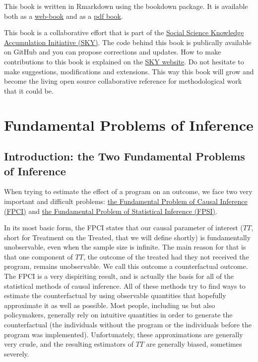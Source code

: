 \documentclass[]{book}
\theoremstyle{definition}
\theoremstyle{definition}
\theoremstyle{definition}
\theoremstyle{remark}
\begin{document}
This book is written in Rmarkdown using the bookdown package.
It is available both as a \href{https://chabefer.github.io/STCI/}{web-book} and as a \href{https://chabefer.github.io/STCI/STCI.pdf}{pdf book}.

This book is a collaborative effort that is part of the \href{https://chabefer.github.io/SKY/}{Social Science Knowledge Accumulation Initiative (SKY)}.
The code behind this book is publically available on GitHub and you can propose corrections and updates.
How to make contributions to this book is explained on the \href{https://chabefer.github.io/SKY/tutoSTCI.html}{SKY website}.
Do not hesitate to make suggestions, modifications and extensions.
This way this book will grow and become the living open source collaborative reference for methodological work that it could be.

\hypertarget{part-fundamental-problems-of-inference}{%
\part{Fundamental Problems of Inference}\label{part-fundamental-problems-of-inference}}

\hypertarget{introduction-the-two-fundamental-problems-of-inference}{%
\chapter*{Introduction: the Two Fundamental Problems of Inference}\label{introduction-the-two-fundamental-problems-of-inference}}

When trying to estimate the effect of a program on an outcome, we face two very important and difficult problems: \href{FPCI.html}{the Fundamental Problem of Causal Inference (FPCI)} and \href{FPSI.html}{the Fundamental Problem of Statistical Inference (FPSI)}.

In its most basic form, the FPCI states that our causal parameter of interest (\(TT\), short for Treatment on the Treated, that we will define shortly) is fundamentally unobservable, even when the sample size is infinite.
The main reason for that is that one component of \(TT\), the outcome of the treated had they not received the program, remains unobservable.
We call this outcome a counterfactual outcome.
The FPCI is a very dispiriting result, and is actually the basis for all of the statistical methods of causal inference.
All of these methods try to find ways to estimate the counterfactual by using observable quantities that hopefully approximate it as well as possible.
Most people, including us but also policymakers, generally rely on intuitive quantities in order to generate the counterfactual (the individuals without the program or the individuals before the program was implemented).
Unfortunately, these approximations are generally very crude, and the resulting estimators of \(TT\) are generally biased, sometimes severely.
\end{document}
